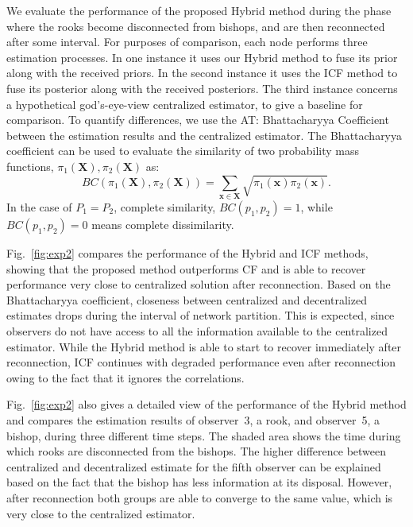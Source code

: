 \documentclass[conference]{IEEEtran}
\newcommand{\vect}[1]{{\mathbf{#1}}}
\theoremstyle{remark}
\newcommand{\axx}[1]{{\color{blue} AT: #1  \ }}  %
\begin{document}
We evaluate the performance of the proposed Hybrid method during the phase 
where the rooks become disconnected from bishops, and are then reconnected 
after some interval. For purposes of comparison, each node performs three 
estimation processes. In one instance it uses our Hybrid method to fuse its 
prior along with the received priors. In the second instance it uses the ICF 
method to fuse its posterior along with the received posteriors. The third 
instance concerns a hypothetical god's-eye-view centralized estimator, to give 
a baseline for comparison. To quantify differences, we use the 
\axx{Bhattacharyya 
Coefficient \cite{bhattacharyya1946measure} between the estimation results and 
the 
centralized estimator. The Bhattacharyya coefficient can be used to evaluate 
the 
similarity of two probability mass functions, $\pi_1(\vect{X}), 
\pi_2(\vect{X})$ as:
\begin{equation}
\textstyle BC(\pi_1(\vect{X}),\pi_2(\vect{X})) = \sum_{\vect{x}\in 
\vect{X}}\sqrt{\pi_1(\vect{x}) \pi_2(\vect{x})}.
\end{equation}
In the case of $P_1= P_2$, complete similarity,  $BC(p_1,p_2)=1$, while 
$BC(p_1,p_2)=0$ means complete dissimilarity.}

Fig.~\ref{fig:exp2} compares the performance of the Hybrid and ICF methods, 
showing that the proposed method outperforms CF and is able to recover 
performance very close to centralized solution after reconnection.  Based on 
the Bhattacharyya coefficient, closeness between centralized and decentralized 
estimates drops during the interval of network partition. This is expected, 
since observers do not have access to all the information available to the 
centralized estimator. While the Hybrid method is able to start to recover 
immediately after reconnection, ICF continues with degraded performance even 
after reconnection owing to the fact that it ignores the correlations. 

Fig.~\ref{fig:exp2} also gives a detailed view of the performance of the Hybrid 
method and compares the estimation results of observer~3, a rook, and 
observer~5, a bishop, during three different time steps. The shaded area shows 
the time during which rooks are disconnected from the bishops. The higher 
difference between centralized and decentralized estimate for the fifth 
observer can be explained based on the fact that the bishop has less 
information at its disposal. However, after reconnection both groups are able 
to converge to the same value, which is very close to the centralized 
estimator. 
\end{document}
